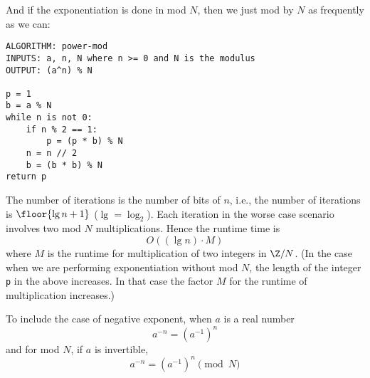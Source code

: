 And if the exponentiation is done in mod $N$, then we just
mod by $N$ as frequently as we can:
\begin{Verbatim}[frame=single,fontsize=\footnotesize]
ALGORITHM: power-mod
INPUTS: a, n, N where n >= 0 and N is the modulus
OUTPUT: (a^n) % N

p = 1
b = a % N
while n is not 0:
    if n % 2 == 1:
        p = (p * b) % N
    n = n // 2 
    b = (b * b) % N
return p    
\end{Verbatim}

The number of iterations is the number of bits of $n$, i.e.,
the number of iterations is $\floor{\lg n + 1}$ ($\lg = \log_2$).
Each iteration in the worse case scenario involves
two mod $N$ multiplications.
Hence the runtime time is
\[
O((\lg n) \cdot M)
\]
where $M$ is the runtime for multiplication of two integers in $\Z/N$.
(In the case when we are performing exponentiation without mod $N$,
the length of the integer \verb!p! in the above increases.
In that case the factor $M$ for the runtime of multiplication increases.)


To include the case of negative exponent, when $a$ is a real number
\[
a^{-n} = (a^{-1})^n
\]
and for mod $N$, if $a$ is invertible,
\[
a^{-n} = (a^{-1})^n \pmod{N}
\]





